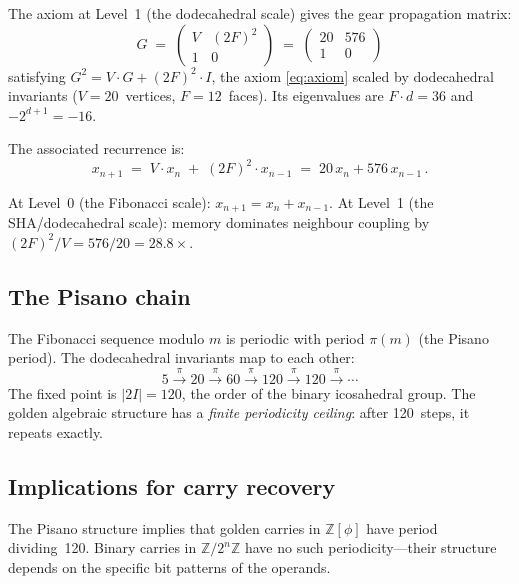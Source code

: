 \documentclass[12pt, a4paper]{article}
\theoremstyle{plain}
\theoremstyle{definition}
\theoremstyle{remark}
\newcommand{\Z}{\mathbb{Z}}
\newcommand{\Zphi}{\Z[\phi]}
\begin{document}
The axiom at Level~1 (the dodecahedral scale) gives the gear
propagation matrix:
\begin{equation}\label{eq:gear}
  G \;=\; \begin{pmatrix} V & (2F)^2 \\ 1 & 0 \end{pmatrix}
  \;=\; \begin{pmatrix} 20 & 576 \\ 1 & 0 \end{pmatrix}
\end{equation}
satisfying $G^2 = V \cdot G + (2F)^2 \cdot I$, the axiom
\eqref{eq:axiom} scaled by dodecahedral invariants
($V = 20$~vertices, $F = 12$~faces).  Its eigenvalues are
$F \cdot d = 36$ and $-2^{d+1} = -16$.

The associated recurrence is:
\begin{equation}\label{eq:recurrence}
  x_{n+1} \;=\; V \cdot x_n \;+\; (2F)^2 \cdot x_{n-1}
  \;=\; 20\,x_n + 576\,x_{n-1}\,.
\end{equation}

At Level~0 (the Fibonacci scale): $x_{n+1} = x_n + x_{n-1}$.
At Level~1 (the SHA/dodecahedral scale): memory dominates neighbour
coupling by $(2F)^2/V = 576/20 = 28.8\times$.

\subsection{The Pisano chain}

The Fibonacci sequence modulo $m$ is periodic with period $\pi(m)$
(the Pisano period).  The dodecahedral invariants map to each other:
\begin{equation}\label{eq:pisano}
  5 \xrightarrow{\pi} 20 \xrightarrow{\pi} 60
    \xrightarrow{\pi} 120 \xrightarrow{\pi} 120
    \xrightarrow{\pi} \cdots
\end{equation}
The fixed point is $|2I| = 120$, the order of the binary icosahedral
group.  The golden algebraic structure has a \emph{finite periodicity
ceiling}: after 120~steps, it repeats exactly.

\subsection{Implications for carry recovery}

The Pisano structure implies that golden carries in $\Zphi$ have
period dividing~120.  Binary carries in $\Z/2^n\Z$ have no such
periodicity---their structure depends on the specific bit patterns
of the operands.
\end{document}
